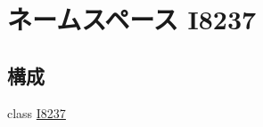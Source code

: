 \hypertarget{namespaceI8237}{
\section{ネームスペース I8237}
\label{namespaceI8237}
}
\subsection*{構成}
\begin{DoxyCompactItemize}
\item 
class \hyperlink{classI8237_1_1I8237}{I8237}
\end{DoxyCompactItemize}
